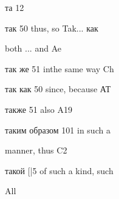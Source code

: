 \begin{minipage}[t]{0.475\textwidth}
\noindent та 12\par
\noindent так 50 thus, so Tak... как\par
\noindent both ... and Ae\par
\noindent так же 51 inthe same way Ch\par
\noindent так как 50 since, because АТ\par
\noindent также 51 also A19\par
\noindent таким образом 101 in such a\par
\noindent manner, thus C2\par
\noindent такой [|5 of such a kind, such\par
\noindent All\par
\end{minipage}
\endgroup

\clearpage
\thispagestyle{plain}
\begingroup
\cyrillicfont
\fontsize{7.25}{8.25}\selectfont
\setlength{\parindent}{0pt}
\setlength{\parskip}{0pt}
\setlength{\emergencystretch}{1.5em}
\noindent
